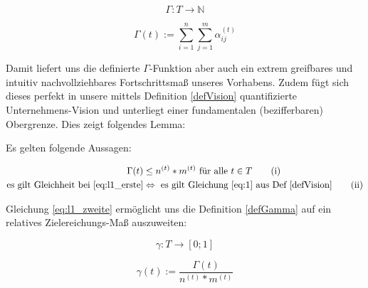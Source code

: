 \vspace{0.3cm}

\begin{Def}\label{defGamma2}

\begin{equation*}
  \Gamma : T \rightarrow \mathbb{N} 
\end{equation*}

\begin{equation*}
  \Gamma(t):= \sum_{i=1}^n \sum_{j=1}^m \alpha^{(t)}_{ij} 
\end{equation*}

\end{Def}

\vspace{1cm}

Damit liefert uns die definierte $\Gamma$-Funktion aber auch ein extrem greifbares und intuitiv nachvollziehbares Fortschrittsmaß unseres Vorhabens. Zudem fügt sich dieses perfekt in unsere mittels Definition \ref{defVision} quantifizierte Unternehmens-Vision und unterliegt einer fundamentalen (bezifferbaren) Obergrenze. Dies zeigt folgendes Lemma:

\vspace{0.3cm}

\begin{Lemma}

Es gelten folgende Aussagen:

\begin{align}
\Gamma(t) &\leq n^{(t)} * m^{(t)} \textrm{ für alle } t \in T \tag{i} \label{eq:l1_erste} \\ 
  \text{es gilt Gleichheit bei }  \eqref{eq:l1_erste} &\Leftrightarrow \text{ es gilt Gleichung } \eqref{eq:1} \text{ aus Def } \ref{defVision} \tag{ii} \label{eq:l1_zweite}
\end{align}

\end{Lemma}

\vspace{0.3cm}

Gleichung \eqref{eq:l1_zweite} ermöglicht uns die Definition \ref{defGamma} auf ein relatives Zielereichungs-Maß auszuweiten:

\vspace{0.3cm}

\begin{Def}\label{defKleinGamma}
\begin{equation*}
  \gamma : T \rightarrow [0; 1] 
\end{equation*}

\begin{equation*}
  \gamma(t):= \frac{\Gamma(t)}{n^{(t)} * m^{(t)}}
\end{equation*}

\end{Def}

\vspace{1.5cm}